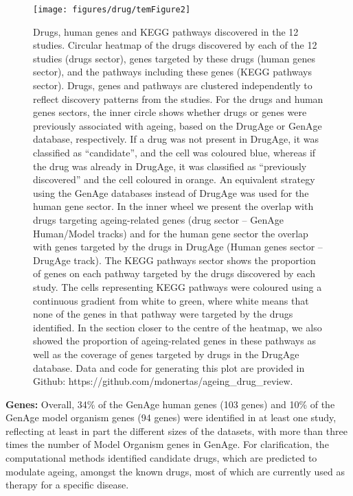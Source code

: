 \documentclass[12pt,twoside]{unicam}
\begin{document}
\begin{figure}

{\centering \texttt{[image: figures/drug/temFigure2]} 

}

\caption[Drugs, human genes and KEGG pathways discovered in the published drug-repurposing studies.]{Drugs, human genes and KEGG pathways discovered in the 12 studies. Circular heatmap of the drugs discovered by each of the 12 studies (drugs sector), genes targeted by these drugs (human genes sector), and the pathways including these genes (KEGG pathways sector). Drugs, genes and pathways are clustered independently to reflect discovery patterns from the studies. For the drugs and human genes sectors, the inner circle shows whether drugs or genes were previously associated with ageing, based on the DrugAge or GenAge database, respectively. If a drug was not present in DrugAge, it was classified as “candidate”, and the cell was coloured blue, whereas if the drug was already in DrugAge, it was classified as “previously discovered” and the cell coloured in orange. An equivalent strategy using the GenAge databases instead of DrugAge was used for the human gene sector. In the inner wheel we present the overlap with drugs targeting ageing-related genes (drug sector – GenAge Human/Model tracks) and for the human gene sector the overlap with genes targeted by the drugs in DrugAge (Human genes sector – DrugAge track). The KEGG pathways sector shows the proportion of genes on each pathway targeted by the drugs discovered by each study. The cells representing KEGG pathways were coloured using a continuous gradient from white to green, where white means that none of the genes in that pathway were targeted by the drugs identified. In the section closer to the centre of the heatmap, we also showed the proportion of ageing-related genes in these pathways as well as the coverage of genes targeted by drugs in the DrugAge database. Data and code for generating this plot are provided in Github: https://github.com/mdonertas/ageing\_drug\_review.}\label{fig:temrevFig2}
\end{figure}

\textbf{Genes:} Overall, 34\% of the GenAge human genes (103 genes) and 10\% of the GenAge model organism genes (94 genes) were identified in at least one study, reflecting at least in part the different sizes of the datasets, with more than three times the number of Model Organism genes in GenAge. For clarification, the computational methods identified candidate drugs, which are predicted to modulate ageing, amongst the known drugs, most of which are currently used as therapy for a specific disease.
\end{document}
